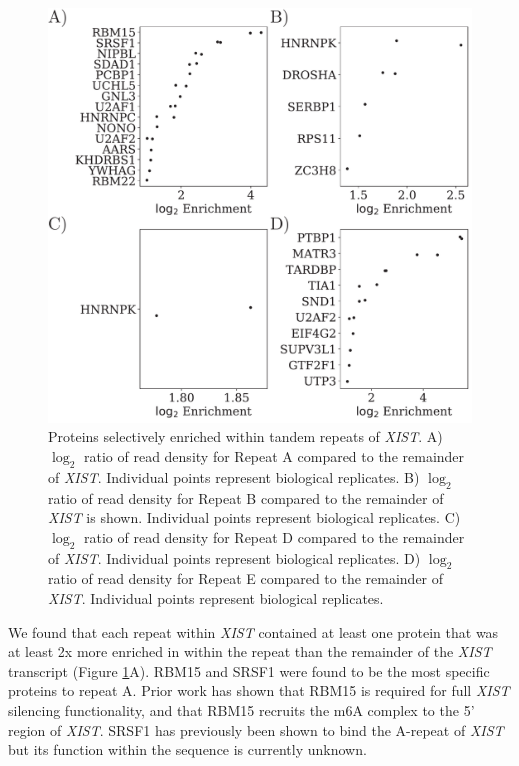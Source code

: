 \begin{figure}[h!]
\centering
\includegraphics[width=\textwidth]{images/sigproteins.pdf}
\caption[\emph{XIST} tandem repeat enriched proteins]{Proteins selectively enriched within tandem repeats of \emph{XIST}. A) $\log_2$ ratio of read density for Repeat A compared to the remainder of \emph{XIST}. Individual points represent biological replicates. B) $\log_2$ ratio of read density for Repeat B compared to the remainder of \emph{XIST} is shown. Individual points represent biological replicates. C) $\log_2$ ratio of read density for Repeat D compared to the remainder of \emph{XIST}. Individual points represent biological replicates. D) $\log_2$ ratio of read density for Repeat E compared to the remainder of \emph{XIST}. Individual points represent biological replicates.}
\label{fig:xistproteins}
\end{figure}

We found that each repeat within \emph{XIST} contained at least one protein that was at least 2x more enriched in within the repeat than the remainder of the \emph{XIST} transcript (Figure \ref{fig:xistproteins}A). RBM15 and SRSF1 were found to be the most specific proteins to repeat A. Prior work has shown that RBM15 is required for full \emph{XIST} silencing functionality, and that RBM15 recruits the m6A complex to the 5' region of \emph{XIST}. SRSF1 has previously been shown to bind the A-repeat of \emph{XIST} but its function within the sequence is currently unknown.


